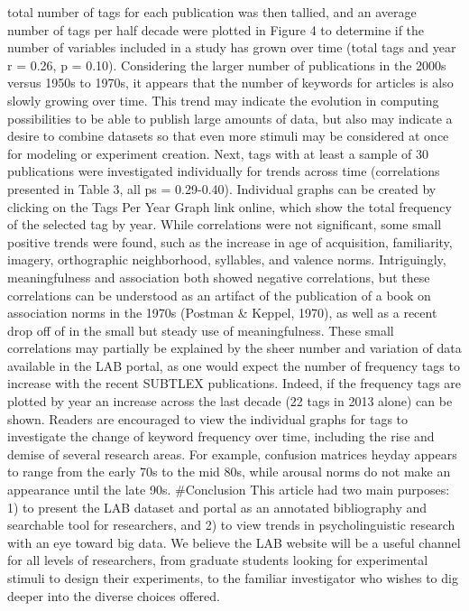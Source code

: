 \documentclass[english,man]{apa6}
\theoremstyle{definition}
\theoremstyle{definition}
\theoremstyle{definition}
\theoremstyle{remark}
\begin{document}
total number of tags for each publication was then tallied, and an
average number of tags per half decade were plotted in Figure 4 to
determine if the number of variables included in a study has grown over
time (total tags and year r = 0.26, p = 0.10). Considering the larger
number of publications in the 2000s versus 1950s to 1970s, it appears
that the number of keywords for articles is also slowly growing over
time. This trend may indicate the evolution in computing possibilities
to be able to publish large amounts of data, but also may indicate a
desire to combine datasets so that even more stimuli may be considered
at once for modeling or experiment creation. Next, tags with at least a
sample of 30 publications were investigated individually for trends
across time (correlations presented in Table 3, all ps = 0.29-0.40).
Individual graphs can be created by clicking on the Tags Per Year Graph
link online, which show the total frequency of the selected tag by year.
While correlations were not significant, some small positive trends were
found, such as the increase in age of acquisition, familiarity, imagery,
orthographic neighborhood, syllables, and valence norms. Intriguingly,
meaningfulness and association both showed negative correlations, but
these correlations can be understood as an artifact of the publication
of a book on association norms in the 1970s (Postman \& Keppel, 1970),
as well as a recent drop off of in the small but steady use of
meaningfulness. These small correlations may partially be explained by
the sheer number and variation of data available in the LAB portal, as
one would expect the number of frequency tags to increase with the
recent SUBTLEX publications. Indeed, if the frequency tags are plotted
by year an increase across the last decade (22 tags in 2013 alone) can
be shown. Readers are encouraged to view the individual graphs for tags
to investigate the change of keyword frequency over time, including the
rise and demise of several research areas. For example, confusion
matrices heyday appears to range from the early 70s to the mid 80s,
while arousal norms do not make an appearance until the late 90s.
\#Conclusion This article had two main purposes: 1) to present the LAB
dataset and portal as an annotated bibliography and searchable tool for
researchers, and 2) to view trends in psycholinguistic research with an
eye toward big data. We believe the LAB website will be a useful channel
for all levels of researchers, from graduate students looking for
experimental stimuli to design their experiments, to the familiar
investigator who wishes to dig deeper into the diverse choices offered.
\end{document}
